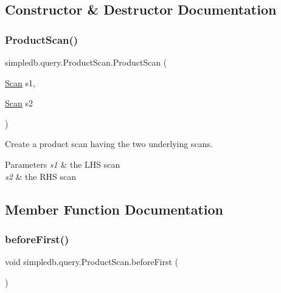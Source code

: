 \subsection{Constructor \& Destructor Documentation}
\mbox{\label{classsimpledb_1_1query_1_1ProductScan_adfac2583e7ed22b4b1e31d6d85c6be38}} 
\subsubsection{\texorpdfstring{Product\+Scan()}{ProductScan()}}
{\footnotesize\ttfamily simpledb.\+query.\+Product\+Scan.\+Product\+Scan (\begin{DoxyParamCaption}\item[{\hyperlink{interfacesimpledb_1_1query_1_1Scan}{Scan}}]{s1,  }\item[{\hyperlink{interfacesimpledb_1_1query_1_1Scan}{Scan}}]{s2 }\end{DoxyParamCaption})\hspace{0.3cm}{\ttfamily [inline]}}

Create a product scan having the two underlying scans. 
\begin{DoxyParams}{Parameters}
{\em s1} & the L\+HS scan \\
\hline
{\em s2} & the R\+HS scan \\
\hline
\end{DoxyParams}


\subsection{Member Function Documentation}
\mbox{\label{classsimpledb_1_1query_1_1ProductScan_a2b5520d561ce26d401b4744f637a4d76}} 
\subsubsection{\texorpdfstring{before\+First()}{beforeFirst()}}
{\footnotesize\ttfamily void simpledb.\+query.\+Product\+Scan.\+before\+First (\begin{DoxyParamCaption}{ }\end{DoxyParamCaption})\hspace{0.3cm}{\ttfamily [inline]}}

